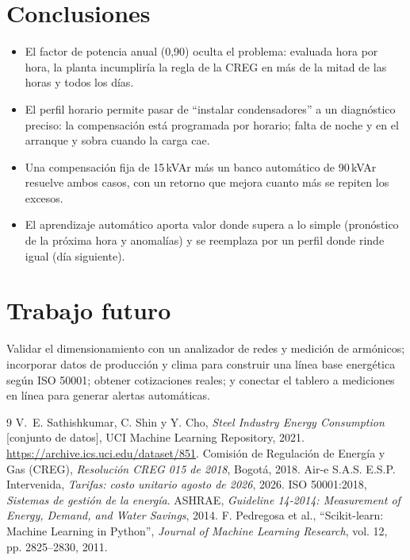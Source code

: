 \documentclass[11pt,a4paper]{article}
\begin{document}
\section{Conclusiones}
\begin{itemize}
\item El factor de potencia anual (0,90) oculta el problema: evaluada hora por hora, la planta incumpliría la regla de la CREG en más de la mitad de las horas y todos los días.
\item El perfil horario permite pasar de ``instalar condensadores'' a un diagnóstico preciso: la compensación está programada por horario; falta de noche y en el arranque y sobra cuando la carga cae.
\item Una compensación fija de 15\,kVAr más un banco automático de 90\,kVAr resuelve ambos casos, con un retorno que mejora cuanto más se repiten los excesos.
\item El aprendizaje automático aporta valor donde supera a lo simple (pronóstico de la próxima hora y anomalías) y se reemplaza por un perfil donde rinde igual (día siguiente).
\end{itemize}

\section{Trabajo futuro}
Validar el dimensionamiento con un analizador de redes y medición de armónicos; incorporar datos de producción y clima para construir una línea base energética según ISO 50001; obtener cotizaciones reales; y conectar el tablero a mediciones en línea para generar alertas automáticas.

\begin{thebibliography}{9}\small
{} V.~E. Sathishkumar, C. Shin y Y. Cho, \emph{Steel Industry Energy Consumption} [conjunto de datos], UCI Machine Learning Repository, 2021. \url{https://archive.ics.uci.edu/dataset/851}.
 Comisión de Regulación de Energía y Gas (CREG), \emph{Resolución CREG 015 de 2018}, Bogotá, 2018.
 Air-e S.A.S. E.S.P. Intervenida, \emph{Tarifas: costo unitario agosto de 2026}, 2026.
 ISO 50001:2018, \emph{Sistemas de gestión de la energía}.
 ASHRAE, \emph{Guideline 14-2014: Measurement of Energy, Demand, and Water Savings}, 2014.
 F. Pedregosa et al., ``Scikit-learn: Machine Learning in Python'', \emph{Journal of Machine Learning Research}, vol. 12, pp. 2825--2830, 2011.
\end{thebibliography}
\end{document}
